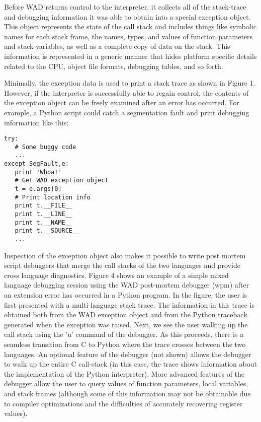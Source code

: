 Before WAD returns control to the interpreter, it collects all of the
stack-trace and debugging information it was able to obtain into a
special exception object. This object represents the state of the call
stack and includes things like symbolic names for each stack frame,
the names, types, and values of function parameters and stack
variables, as well as a complete copy of data on the stack. This
information is represented in a generic manner that hides
platform specific details related to the CPU, object file formats,
debugging tables, and so forth.

Minimally, the exception data is used to print a stack trace as shown
in Figure 1.  However, if the interpreter is successfully able to
regain control, the contents of the exception object can be
freely examined after an error has occurred.  For example, a Python
script could catch a segmentation fault and print debugging information
like this:

\begin{verbatim}
try:
   # Some buggy code
   ...
except SegFault,e:
   print 'Whoa!'
   # Get WAD exception object
   t = e.args[0]
   # Print location info
   print t.__FILE__
   print t.__LINE__
   print t.__NAME__
   print t.__SOURCE__
   ...
\end{verbatim}

Inspection of the exception object also makes it possible to write post mortem
script debuggers that merge the call stacks of the two languages and
provide cross language diagnostics.  Figure 4 shows an
example of a simple mixed language debugging session using the WAD
post-mortem debugger (wpm) after an extension error has occurred in a
Python program.  In the figure, the user is first presented with a
multi-language stack trace.  The information in this trace is obtained
both from the WAD exception object and from the Python traceback
generated when the exception was raised. Next, we see the user walking
up the call stack using the 'u' command of the debugger.  As this
proceeds, there is a seamless transition from C to Python where the
trace crosses between the two languages.  An optional feature of the
debugger (not shown) allows the debugger to walk up the entire C
call-stack (in this case, the trace shows information about the
implementation of the Python interpreter).  More advanced features of
the debugger allow the user to query values of function
parameters, local variables, and stack frames (although some of this
information may not be obtainable due to compiler optimizations and the
difficulties of accurately recovering register values).

